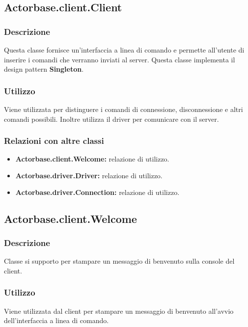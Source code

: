 \documentclass[a4paper]{article}
\begin{document}
		\subsection{Actorbase.client.Client}
			\subsubsection{Descrizione}
				Questa classe fornisce un'interfaccia a linea di comando e permette all'utente di inserire i comandi che verranno inviati al server. 
				Questa classe implementa il design pattern \textbf{Singleton}.
				
			\subsubsection{Utilizzo}
				Viene utilizzata per distinguere i comandi di connessione, disconnessione e altri comandi possibili. Inoltre utilizza il driver per comunicare 
				con il server.
				
			\subsubsection{Relazioni con altre classi}
				\begin{itemize}
					\item \textbf{Actorbase.client.Welcome:} relazione di utilizzo.
					\item \textbf{Actorbase.driver.Driver:} relazione di utilizzo.
					\item \textbf{Actorbase.driver.Connection:} relazione di utilizzo.
				\end{itemize}
		
		\subsection{Actorbase.client.Welcome}
			\subsubsection{Descrizione}
				Classe si supporto per stampare un messaggio di benvenuto sulla console del client.
				
			\subsubsection{Utilizzo}
				Viene utilizzata dal client per stampare un messaggio di benvenuto all'avvio dell'interfaccia a linea di comando.
				
\end{document}
